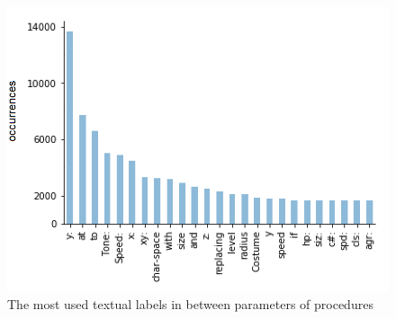 \documentclass[conference]{IEEEtran}
\begin{document}
\begin{figure}
	\begin{center}
		\includegraphics[width=\columnwidth]{fig/text_in_the_middle_func_occurrences}
		\caption{The most used textual labels in between parameters of procedures}
		\label{fig:labels}
	\end{center}
\end{figure} 
\end{document}
